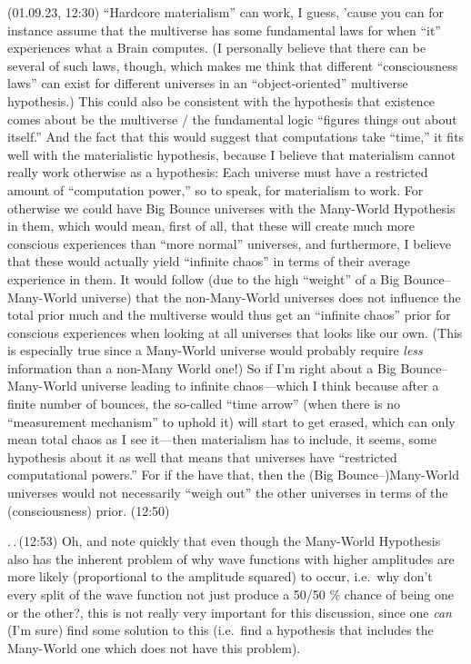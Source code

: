 \documentclass{report}
\begin{document}
(01.09.23, 12:30) ``Hardcore materialism'' can work, I guess, 'cause you can for instance assume that the multiverse has some fundamental laws for when ``it'' experiences what a Brain computes. (I personally believe that there can be several of such laws, though, which makes me think that different ``consciousness laws'' can exist for different universes in an ``object-oriented'' multiverse hypothesis.) This could also be consistent with the hypothesis that existence comes about be the multiverse / the fundamental logic ``figures things out about itself.'' And the fact that this would suggest that computations take ``time,'' it fits well with the materialistic hypothesis, because I believe that materialism cannot really work otherwise as a hypothesis: Each universe must have a restricted amount of ``computation power,'' so to speak, for materialism to work. For otherwise we could have Big Bounce universes with the Many-World Hypothesis in them, which would mean, first of all, that these will create much more conscious experiences than ``more normal'' universes, and furthermore, I believe that these would actually yield ``infinite chaos'' in terms of their average experience in them. It would follow (due to the high ``weight'' of a Big Bounce--Many-World universe) that the non-Many-World universes does not influence the total prior much and the multiverse would thus get an ``infinite chaos'' prior for conscious experiences when looking at all universes that looks like our own. (This is especially true since a Many-World universe would probably require \emph{less} information than a non-Many World one!) So if I'm right about a Big Bounce--Many-World universe leading to infinite chaos---which I think because after a finite number of bounces, the so-called ``time arrow'' (when there is no ``measurement mechanism'' to uphold it) will start to get erased, which can only mean total chaos as I see it---then materialism has to include, it seems, some hypothesis about it as well that means that universes have ``restricted computational powers.'' For if the have that, then the (Big Bounce--)Many-World universes would not necessarily ``weigh out'' the other universes in terms of the (consciousness) prior. (12:50)

.\,.\,(12:53) Oh, and note quickly that even though the Many-World Hypothesis also has the inherent problem of why wave functions with higher amplitudes are more likely (proportional to the amplitude squared) to occur, i.e.\ why don't every split of the wave function not just produce a 50/50 \% chance of being one or the other?, this is not really very important for this discussion, since one \emph{can} (I'm sure) find some solution to this (i.e.\ find a hypothesis that includes the Many-World one which does not have this problem). %
\end{document}

